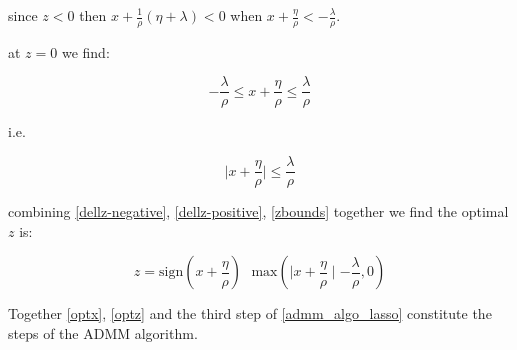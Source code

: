 \documentclass{article}
\begin{document}
since \(z<0\) then \(x + \frac{1}{\rho} ( \eta + \lambda ) < 0\) when \(x + \frac{\eta}{\rho} < - \frac{\lambda}{\rho}\).

at \(z=0\) we find:

\begin{equation*}
-\frac{\lambda}{\rho} \leq x + \frac{\eta}{\rho} \leq \frac{\lambda}{\rho}
\end{equation*}

i.e.

\begin{equation}
\mid x+ \frac{\eta}{\rho}\mid \leq \frac{\lambda}{\rho}
\label{zbounds}
\end{equation}

combining \eqref{dellz-negative}, \eqref{dellz-positive}, \eqref{zbounds} together we find the optimal \(z\) is:

\begin{equation}
z = \mathrm{sign}(x+\frac{\eta}{\rho})\text{ }\mathrm{max}\left( \mid x+\frac{\eta}{\rho} \mid - \frac{\lambda}{\rho} ,0\right)
\label{optz}
\end{equation}

Together \eqref{optx}, \eqref{optz} and the third step of \eqref{admm_algo_lasso} constitute the steps of the ADMM algorithm.
\end{document}
